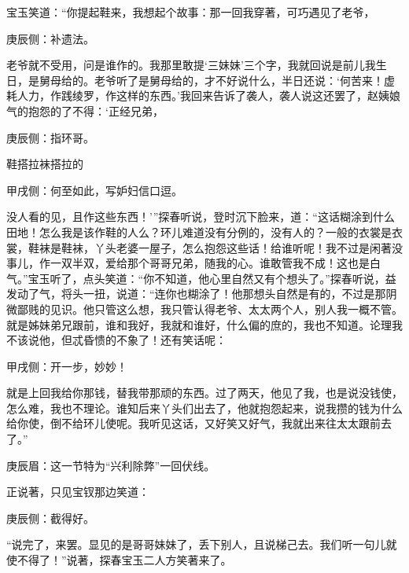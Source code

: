 \begin{parag}
    宝玉笑道：“你提起鞋来，我想起个故事：那一回我穿著，可巧遇见了老爷，\begin{note}庚辰侧：补遗法。\end{note}老爷就不受用，问是谁作的。我那里敢提‘三妹妹’三个字，我就回说是前儿我生日，是舅母给的。老爷听了是舅母给的，才不好说什么，半日还说：‘何苦来！虚耗人力，作践绫罗，作这样的东西。’我回来告诉了袭人，袭人说这还罢了，赵姨娘气的抱怨的了不得：‘正经兄弟，\begin{note}庚辰侧：指环哥。\end{note}鞋搭拉袜搭拉的\begin{note}甲戌侧：何至如此，写妒妇信口逗。\end{note}没人看的见，且作这些东西！’”探春听说，登时沉下脸来，道：“这话糊涂到什么田地！怎么我是该作鞋的人么？环儿难道没有分例的，没有人的？一般的衣裳是衣裳，鞋袜是鞋袜，丫头老婆一屋子，怎么抱怨这些话！给谁听呢！我不过是闲著没事儿，作一双半双，爱给那个哥哥兄弟，随我的心。谁敢管我不成！这也是白气。”宝玉听了，点头笑道：“你不知道，他心里自然又有个想头了。”探春听说，益发动了气，将头一扭，说道：“连你也糊涂了！他那想头自然是有的，不过是那阴微鄙贱的见识。他只管这么想，我只管认得老爷、太太两个人，别人我一概不管。就是姊妹弟兄跟前，谁和我好，我就和谁好，什么偏的庶的，我也不知道。论理我不该说他，但忒昏愦的不象了！还有笑话呢：\begin{note}甲戌侧：开一步，妙妙！\end{note}就是上回我给你那钱，替我带那顽的东西。过了两天，他见了我，也是说没钱使，怎么难，我也不理论。谁知后来丫头们出去了，他就抱怨起来，说我攒的钱为什么给你使，倒不给环儿使呢。我听见这话，又好笑又好气，我就出来往太太跟前去了。”\begin{note}庚辰眉：这一节特为“兴利除弊”一回伏线。\end{note}正说著，只见宝钗那边笑道：\begin{note}庚辰侧：截得好。\end{note}“说完了，来罢。显见的是哥哥妹妹了，丢下别人，且说梯己去。我们听一句儿就使不得了！”说著，探春宝玉二人方笑著来了。
\end{parag}



